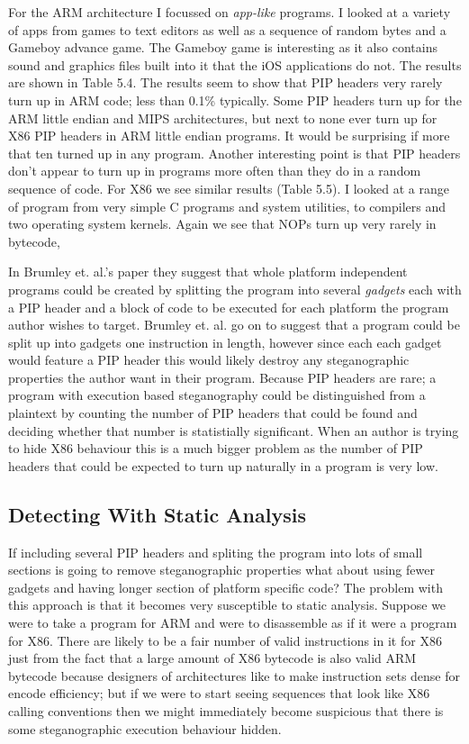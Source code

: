 \documentclass[10pt,]{book}
\begin{document}
For the ARM architecture I focussed on \emph{app-like} programs. I
looked at a variety of apps from games to text editors as well as a
sequence of random bytes and a Gameboy advance game. The Gameboy game is
interesting as it also contains sound and graphics files built into it
that the iOS applications do not. The results are shown in Table 5.4.
The results seem to show that PIP headers very rarely turn up in ARM
code; less than 0.1\% typically. Some PIP headers turn up for the ARM
little endian and MIPS architectures, but next to none ever turn up for
X86 PIP headers in ARM little endian programs. It would be surprising if
more that ten turned up in any program. Another interesting point is
that PIP headers don't appear to turn up in programs more often than
they do in a random sequence of code. For X86 we see similar results
(Table 5.5). I looked at a range of program from very simple C programs
and system utilities, to compilers and two operating system kernels.
Again we see that NOPs turn up very rarely in bytecode,

In Brumley et. al.'s paper\autocite{Cha:2010uh} they suggest that whole
platform independent programs could be created by splitting the program
into several \emph{gadgets} each with a PIP header and a block of code
to be executed for each platform the program author wishes to target.
Brumley et. al. go on to suggest that a program could be split up into
gadgets one instruction in length, however since each each gadget would
feature a PIP header this would likely destroy any steganographic
properties the author want in their program. Because PIP headers are
rare; a program with execution based steganography could be
distinguished from a plaintext by counting the number of PIP headers
that could be found and deciding whether that number is statistially
significant. When an author is trying to hide X86 behaviour this is a
much bigger problem as the number of PIP headers that could be expected
to turn up naturally in a program is very low.

\subsection{Detecting With Static Analysis}

If including several PIP headers and spliting the program into lots of
small sections is going to remove steganographic properties what about
using fewer gadgets and having longer section of platform specific code?
The problem with this approach is that it becomes very susceptible to
static analysis. Suppose we were to take a program for ARM and were to
disassemble as if it were a program for X86. There are likely to be a
fair number of valid instructions in it for X86 just from the fact that
a large amount of X86 bytecode is also valid ARM bytecode because
designers of architectures like to make instruction sets dense for
encode efficiency; but if we were to start seeing sequences that look
like X86 calling conventions then we might immediately become suspicious
that there is some steganographic execution behaviour hidden.
\end{document}
